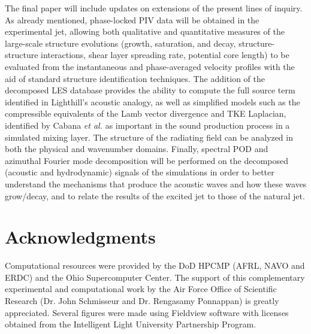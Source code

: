 \documentclass[english]{aiaa-tc}
\begin{document}
The final paper will include updates on extensions of the present lines of
inquiry. As already mentioned, phase-locked PIV data will be 
obtained in the experimental jet, allowing both qualitative and
quantitative measures of the large-scale structure evolutions (growth,
saturation, and decay, structure-structure interactions, shear layer
spreading rate, potential core length) to be evaluated from the
instantaneous and phase-averaged velocity profiles with the aid of
standard structure identification techniques. The addition of the
decomposed LES database provides the ability to compute the full
source term identified in Lighthill's acoustic analogy, as well as
simplified models such as the compressible equivalents of the Lamb
vector divergence and TKE Laplacian, identified by Cabana {\em et
  al.}\cite{Cabana2008} as important in the sound production process
in a simulated mixing layer. The structure of the radiating
field can be analyzed in both the physical and wavenumber
domains. Finally, spectral POD and azimuthal Fourier mode
decomposition will be performed on the decomposed (acoustic and
hydrodynamic) signals of the simulations in order to better understand
the mechanisms that produce the acoustic waves and how these waves
grow/decay, and to relate the results of the excited jet to those of
the natural jet.  


\section*{Acknowledgments}
   Computational resources were provided by the DoD HPCMP (AFRL, NAVO
   and ERDC) and the Ohio Supercomputer Center. The support of this
   complementary experimental and computational work by the Air Force
   Office of Scientific Research (Dr. John Schmisseur and
   Dr. Rengasamy Ponnappan) is greatly appreciated. Several figures
   were made using Fieldview software with licenses obtained from the
   Intelligent Light University Partnership Program. 



\end{document}
